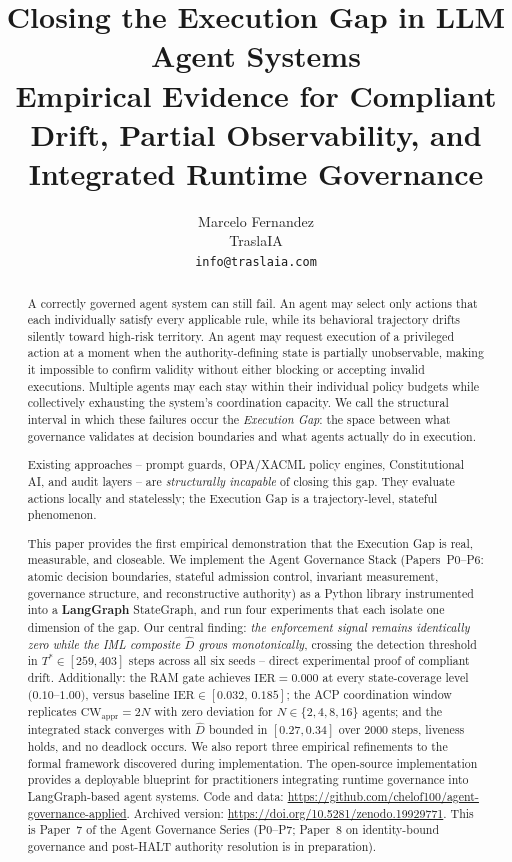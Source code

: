 \documentclass[11pt]{article}
\title{\textbf{Closing the Execution Gap in LLM Agent Systems}\\[4pt]
       \large Empirical Evidence for Compliant Drift, Partial Observability,
       and Integrated Runtime Governance}
\author{Marcelo Fernandez\\
        \small TraslaIA\\
        \small \texttt{info@traslaia.com}}
\date{}
\newcommand{\Dhat}{\widehat{D}}
\newcommand{\CW}{\mathrm{CW}}
\newcommand{\IER}{\mathrm{IER}}
\begin{document}
\maketitle

\begin{abstract}
A correctly governed agent system can still fail.
An agent may select only actions that each individually satisfy every
applicable rule, while its behavioral trajectory drifts silently toward
high-risk territory.
An agent may request execution of a privileged action at a moment when the
authority-defining state is partially unobservable, making it impossible to
confirm validity without either blocking or accepting invalid executions.
Multiple agents may each stay within their individual policy budgets while
collectively exhausting the system's coordination capacity.
We call the structural interval in which these failures occur the
\emph{Execution Gap}: the space between what governance validates at decision
boundaries and what agents actually do in execution.

Existing approaches -- prompt guards, OPA/XACML policy engines, Constitutional
AI, and audit layers -- are \emph{structurally incapable} of closing this gap.
They evaluate actions locally and statelessly; the Execution Gap is a
trajectory-level, stateful phenomenon.

This paper provides the first empirical demonstration that the Execution Gap
is real, measurable, and closeable.
We implement the Agent Governance Stack (Papers~P0--P6: atomic decision
boundaries, stateful admission control, invariant measurement, governance
structure, and reconstructive authority) as a Python library instrumented
into a \textbf{LangGraph}
StateGraph, and run four experiments that each isolate one dimension of the gap.
Our central finding: \emph{the enforcement signal remains identically zero while
the IML composite $\Dhat$ grows monotonically}, crossing the detection
threshold in $T^*\in[259,403]$ steps across all six seeds -- direct
experimental proof of compliant drift.
Additionally: the RAM gate achieves $\IER=0.000$ at every state-coverage level
$(0.10$--$1.00)$, versus baseline $\IER\in[0.032,\,0.185]$; the ACP
coordination window replicates $\CW_{\mathrm{appr}}=2N$ with zero deviation
for $N\in\{2,4,8,16\}$ agents; and the integrated stack converges with
$\Dhat$ bounded in $[0.27,0.34]$ over 2000 steps, liveness holds, and no
deadlock occurs.
We also report three empirical refinements to the formal framework discovered
during implementation.
The open-source implementation provides a deployable blueprint for
practitioners integrating runtime governance into LangGraph-based agent systems.
Code and data: \url{https://github.com/chelof100/agent-governance-applied}.
Archived version: \url{https://doi.org/10.5281/zenodo.19929771}.
This is Paper~7 of the Agent Governance Series (P0--P7; Paper~8 on identity-bound governance and post-HALT authority resolution is in preparation).
\end{abstract}
\end{document}
